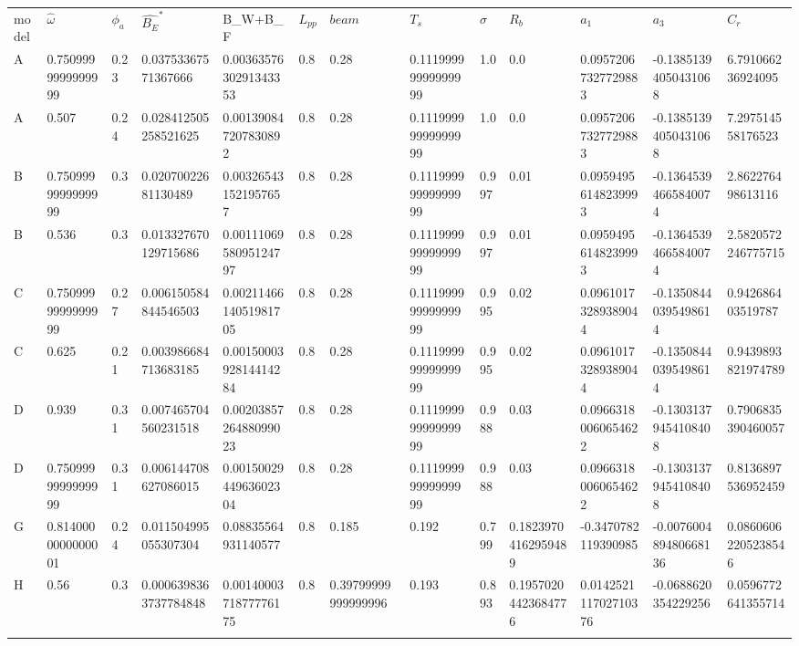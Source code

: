     \begin{longtable}[c]{@{}lllllllllllll@{}}
\toprule\addlinespace
model & $\hat{\omega}$ & $\phi_a$ & $\hat{B_E}^*$ & B_W+B_F & $L_{pp}$ & $beam$ & $T_s$ & $\sigma$ & $R_b$ & $a_1$ & $a_3$ & $C_r$\\\addlinespace 
\midrule\endhead
A & 0.7509999999999999 & 0.23 & 0.03753367571367666 & 0.0036357630291343353 & 0.8 & 0.28 & 0.11199999999999999 & 1.0 & 0.0 & 0.09572067327729883 & -0.13851394050431068 & 6.791066236924095\\\addlinespace 
A & 0.507 & 0.24 & 0.028412505258521625 & 0.001390847207830892 & 0.8 & 0.28 & 0.11199999999999999 & 1.0 & 0.0 & 0.09572067327729883 & -0.13851394050431068 & 7.297514558176523\\\addlinespace 
B & 0.7509999999999999 & 0.3 & 0.02070022681130489 & 0.003265431521957657 & 0.8 & 0.28 & 0.11199999999999999 & 0.997 & 0.01 & 0.09594956148239993 & -0.13645394665840074 & 2.862276498613116\\\addlinespace 
B & 0.536 & 0.3 & 0.013327670129715686 & 0.0011106958095124797 & 0.8 & 0.28 & 0.11199999999999999 & 0.997 & 0.01 & 0.09594956148239993 & -0.13645394665840074 & 2.5820572246775715\\\addlinespace 
C & 0.7509999999999999 & 0.27 & 0.006150584844546503 & 0.0021146614051981705 & 0.8 & 0.28 & 0.11199999999999999 & 0.995 & 0.02 & 0.09610173289389044 & -0.13508440395498614 & 0.942686403519787\\\addlinespace 
C & 0.625 & 0.21 & 0.003986684713683185 & 0.0015000392814414284 & 0.8 & 0.28 & 0.11199999999999999 & 0.995 & 0.02 & 0.09610173289389044 & -0.13508440395498614 & 0.9439893821974789\\\addlinespace 
D & 0.939 & 0.31 & 0.007465704560231518 & 0.0020385726488099023 & 0.8 & 0.28 & 0.11199999999999999 & 0.988 & 0.03 & 0.09663180060654622 & -0.13031379454108408 & 0.7906835390460057\\\addlinespace 
D & 0.7509999999999999 & 0.31 & 0.006144708627086015 & 0.0015002944963602304 & 0.8 & 0.28 & 0.11199999999999999 & 0.988 & 0.03 & 0.09663180060654622 & -0.13031379454108408 & 0.8136897536952459\\\addlinespace 
G & 0.8140000000000001 & 0.24 & 0.011504995055307304 & 0.08835564931140577 & 0.8 & 0.185 & 0.192 & 0.799 & 0.18239704162959489 & -0.3470782119390985 & -0.007600489480668136 & 0.08606062205238546\\\addlinespace 
H & 0.56 & 0.3 & 0.0006398363737784848 & 0.0014000371877776175 & 0.8 & 0.39799999999999996 & 0.193 & 0.893 & 0.19570204423684776 & 0.014252111702710376 & -0.0688620354229256 & 0.0596772641355714\\\addlinespace 

\end{longtable}
